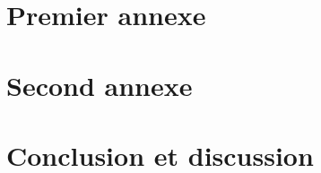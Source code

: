 \documentclass[a4paper]{article}
\begin{document}
\section{Premier annexe}
\section{Second annexe}

\section{Conclusion et discussion}

\tableofcontents    %
\listoffigures        %
\listoftables        %

\end{document}

